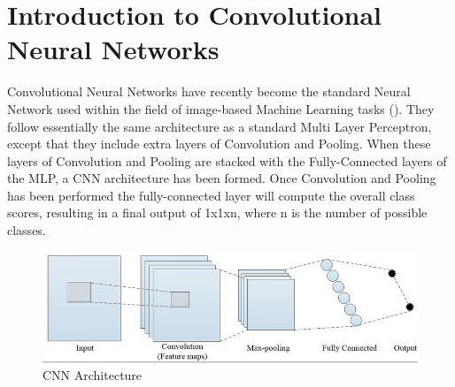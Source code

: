 \documentclass[12pt]{report}
\begin{document}
\section{Introduction to Convolutional Neural Networks}
\begin{flushleft}
Convolutional Neural Networks have recently become the standard Neural Network used within the field of image-based Machine Learning tasks (\cite{o2015introduction}). They follow essentially the same architecture as a standard Multi Layer Perceptron, except that they include extra layers of Convolution and Pooling. When these layers of Convolution and Pooling are stacked with the Fully-Connected layers of the MLP, a CNN architecture has been formed. Once Convolution and Pooling has been performed the fully-connected layer will compute the overall class scores, resulting in a final output of 1x1xn, where n is the number of possible classes.
\end{flushleft}

\vspace{0.5cm}
\begin{figure}[ht!]
	\centering
	\includegraphics[width=12cm]{convo}
	\caption{CNN Architecture}
	\label{fig:convo}
\end{figure}

\newpage
\end{document}
